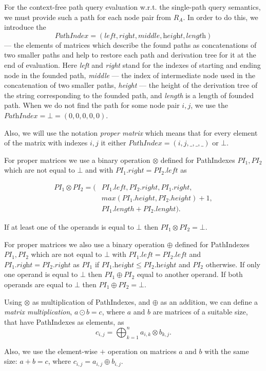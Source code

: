 For the context-free path query evaluation w.r.t. the single-path query semantics, we must provide such a path for each node pair from $R_A$. In order to do this, we introduce the 
$$\textit{PathIndex} = (\textit{left},\textit{right},\textit{middle},\textit{height},\textit{length})$$ 
--- the elements of matrices which describe the found paths as concatenations of two smaller paths and help to restore each path and derivation tree for it at the end of evaluation. Here \textit{left} and \textit{right} stand for the indexes of starting and ending node in the founded path, \textit{middle} --- the index of intermediate node used in the concatenation of two smaller paths, \textit{height} --- the height of the derivation tree of the string corresponding to the founded path, and \textit{length} is a length of founded path. When we do not find the path for some node pair $i,j$, we use the $\textit{PathIndex} = \bot = (0,0,0,0,0)$.

Also, we will use the notation \textit{proper matrix} which means that for every element of the matrix with indexes $i,j$ it either $\textit{PathIndex} = (i,j,\_,\_,\_)$ or $\bot$.

For proper matrices we use a binary operation $\otimes$ defined for PathIndexes \mbox{$PI_1, PI_2$} which are not equal to $\bot$ and with $PI_1.\textit{right} = PI_2.\textit{left}$ as 

\begin{align*}
PI_1 \otimes PI_2 = (&PI_1.left, PI_2.right, PI_1.right, \\
                     &max(PI_1.height, PI_2.height)+1,\\
                     &PI_1.length + PI_2.lenght).
\end{align*}

If at least one of the operands is equal to $\bot$ then $PI_1 \otimes PI_2 = \bot$.

For proper matrices we also use a binary operation $\oplus$ defined for PathIndexes \mbox{$PI_1, PI_2$} which are not equal to $\bot$ with $PI_1.\textit{left} = PI_2.\textit{left}$ and $PI_1.\textit{right} = PI_2.\textit{right}$ as $PI_1$ if $PI_1.\textit{height} \leq PI_2.\textit{height}$ and $PI_2$ otherwise. If only one operand is equal to $\bot$ then $PI_1 \oplus PI_2$ equal to another operand. If both operands are equal to $\bot$ then $PI_1 \oplus PI_2 = \bot$.

Using $\otimes$ as multiplication of PathIndexes, and $\oplus$ as an addition, we can define a \emph{matrix multiplication}, \mbox{$a \odot b = c$}, where $a$ and $b$ are matrices of a suitable size, that have PathIndexes as elements, as $$c_{i,j} = \bigoplus^{n}_{k=1}{a_{i,k} \otimes b_{k,j}}.$$

Also, we use the element-wise $+$ operation on matrices $a$ and $b$ with the same size: \mbox{$a + b = c$}, where $c_{i,j} = a_{i,j} \oplus b_{i,j}.$
